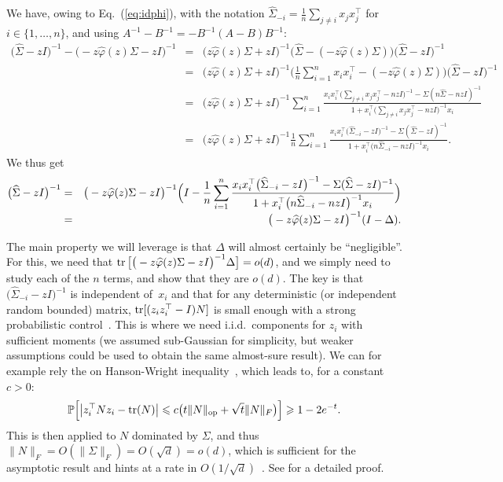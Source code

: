 \documentclass[11pt]{article}
\newcommand{\BEAS}{\begin{eqnarray*}}
\newcommand{\EEAS}{\end{eqnarray*}}
\newcommand{\BEA}{\begin{eqnarray}}
\newcommand{\EEA}{\end{eqnarray}}
\newcommand{\tr}{\mathop{ \rm tr}}
\newcommand{\idm}{I}
\newcommand{\ds}{\displaystyle }
\newcommand{\eq}[1]{Eq.~(\ref{eq:#1})}
\def \hphi{ \widehat{\varphi} }
\def \hS{ \widehat{ \Sigma} }
\def \S{  { \Sigma} }
\def \P{{\mathbb P}}
\def \P{{\mathbb P}}
\begin{document}
We have, owing to \eq{idphi}, with the notation $\hS_{-i} = \frac{1}{n} \sum_{j \neq i} x_j x_j^\top$ for $i \in \{1,\dots,n\}$, and using $A^{-1} - B^{-1} = - B^{-1} ( A - B) B^{-1}$:
\BEAS
\big( \hS \!-\!  z\idm \big)^{-1}\! -\! 
\big( \!-\! z \hphi(z) \S\! -\! z \idm \big)^{-1}
& = & 
\big( z \hphi(z) \S  + z \idm \big)^{-1}
\Big( \hS  - ( - z \hphi(z) \S ) \Big) \big( \hS -  z\idm \big)^{-1}
\\[-.1cm]
& = & 
\big( z \hphi(z) \S  + z \idm \big)^{-1}
\Big( \frac{1}{n} \sum_{i=1}^n x_i x_i^\top  - ( - z \hphi(z) \S ) \Big) \big( \hS -  z\idm \big)^{-1}
\\[-.1cm]
& = & 
  \big( z \hphi(z) \S  \!+\! z \idm \big)^{-1} \sum_{i=1}^n
  \frac{  x_i x_i^\top   \big(   \sum_{j \neq i} x_j x_j^\top \! -\! n z    \idm \big)^{-1}
\! \! -\! \S ( n \hS \!-\! nz \idm)^{-1} }{1\!+\! x_i^\top   \big(   \sum_{j \neq i} x_j x_j^\top \! -\! n z    \idm \big)^{-1} x_i}
\\[-.1cm]
& = & 
  \big( z \hphi(z) \S  + z \idm \big)^{-1} \frac{1}{n}\sum_{i=1}^n
  \frac{  x_i x_i^\top   \big(       \hS_{-i}   -   z    \idm \big)^{-1}
  - \S (   \hS -  z \idm)^{-1} }{1+ x_i^\top   \big(   n \hS_{-i}  - n z    \idm \big)^{-1} x_i}.
  \EEAS
  We thus get
  \BEA
 \label{eq:Delta} \big( \hS -  z\idm \big)^{-1} 
  & = & \big( - z \hphi(z) \S - z \idm \big)^{-1} \Big( \idm - 
  \frac{1}{n} \sum_{i=1}^n
  \frac{  x_i x_i^\top   \big(       \hS_{-i}   -   z    \idm \big)^{-1}
  - \S (   \hS -  z \idm)^{-1} }{1+ x_i^\top   \big(   n \hS_{-i}  - n z    \idm \big)^{-1} x_i}\Big)
  \\[-.1cm]
 \notag & = &   \big( - z \hphi(z) \S - z \idm \big)^{-1}  ( \idm - \Delta).
  \EEA

The main property we will leverage is that $\Delta $ will almost certainly be  ``negligible''.
For this, we need that 
$\ds \tr\big[ \big( - z \hphi(z) \S - z \idm \big)^{-1} \Delta \big] = o(d)$, and we simply need to study each of the $n$ terms, and show that they are $o(d)$. The key is that $\big(    \hS_{-i}  -  z    \idm \big)^{-1}$ is independent of~$x_i$ and that for any deterministic (or independent random bounded) matrix, 
$ \tr [ ( z_iz_i^\top - \idm) N ] $ is small enough with a strong probabilistic control~\cite[Lemma 3.1]{silverstein1995empirical}. This is where we need i.i.d.~components for $z_i$ with sufficient moments (we assumed sub-Gaussian for simplicity, but weaker assumptions could be used to obtain the same almost-sure result). We can for example rely the on Hanson-Wright inequality~\cite{hansonwright}, which leads to, for a constant $c>0$:
$$
\P\Big[  \big| z_i^\top N z_i - \tr (N) \big| \leqslant c \big(  t \| N \|_{\rm op} + \sqrt{t} \| N \|_F \big)\Big] \geqslant 1 - 2 e^{-t}.
$$
This is then applied to $N$ dominated by $\Sigma$, and thus $\| N\|_F = O( \| \Sigma\|_F) = O(\sqrt{d}) = o(d)$, which is sufficient for the asymptotic result and hints at a rate in $O(1/\sqrt{d})$~\cite{bai2008clt}. See \cite{silverstein1995strong} for a detailed proof.
 
\end{document}
